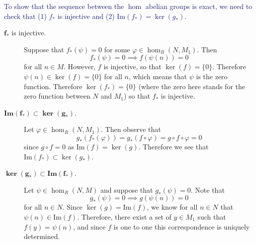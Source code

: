 \documentclass[12pt,letterpaper]{algebra_book}
\newcommand{\im}{\mbox{Im}}
\renewcommand{\phi}{\varphi}
\theoremstyle{definition}
\begin{document}
\begin{prf}
    \textcolor{MidnightBlue}{To show that the sequence between the
    $\hom$ abelian groups is exact, we need to check that (1)
    $f_*$ is injective and (2) $\im(f_*) = \ker(g_*)$.
    }
    \begin{description}
        \item[$\bm{f_*}$ is injective.]
            Suppose that $f_*(\psi) = 0$ for some $\phi \in
            \hom_R(N, M_1)$. Then 
            \[
                f_*(\psi) = 0 \implies f(\psi(n)) = 0
            \] 
            for all $n \in M$. However, $f$ is injective, so that
            $\ker(f) = \{0\}$. Therefore $\psi(n) \in \ker(f) =
            \{0\}$ for all $n$, which means that $\psi$ is the
            zero function. Therefore $\ker(f_*) = \{0\}$ (where
            the zero here stands for the zero function between $N$
            and $M_1$) so that $f_*$ is injective. 

            \item[$\bm{\im(f_*) \subset \ker(g_*)}$.]
            Let $\phi \in \hom_R(N, M_1)$. Then observe that 
            \[
                g_*(f_*(\phi)) = g_*(f \circ \phi) = g \circ f \circ \phi = 0
            \] 
            since $g \circ f = 0$ as $\im(f) =
            \ker(g)$.
            Therefore we see that $\im(f_*) \subset \ker(g_*)$. 
    
            \item[$\bm{\ker(g_*) \subset \im(f_*)}$.]
            Let $\psi \in \hom_R(N, M)$ and suppose that $g_*(\psi)
            = 0$. Note that 
            \[
                g_*(\psi) = 0 \implies g(\psi(n)) = 0
            \]
            for all $n \in N$. Since $\ker(g) = \im(f)$, we know
            for all $n \in N$ that $\psi(n) \in \im(f)$.
            Therefore, there exist a set of $y \in M_1$ such that
            $f(y) = \psi(n)$, and since $f$ is one to one this
            correspondence is uniquely determined. 


\end{description}
\end{prf}
\end{document}
